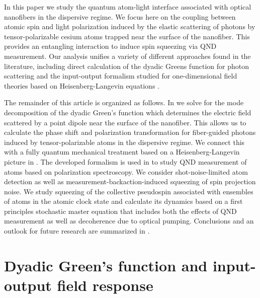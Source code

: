 \documentclass[aps,pra,twocolumn]{revtex4-1} %
\begin{document}
In this paper we study the quantum atom-light interface associated with optical nanofibers in the dispersive regime.  
We focus here on the coupling between atomic spin and light polarization induced by the elastic scattering of photons by tensor-polarizable cesium atoms trapped near the surface of the nanofiber.  
This provides an entangling interaction to induce spin squeezing via QND measurement.  
Our analysis unifies a variety of different approaches found in the literature, including direct calculation of the dyadic Greens function for photon scattering \cite{sakoda_optical_1996, dung_spontaneous_2000, sondergaard_general_2001, klimov_spontaneous_2004, wubs_multiple-scattering_2004, fussell_decay_2005, manga_rao_single_2007, dzsotjan_quantum_2010} and the input-output formalism studied for one-dimensional field theories based on Heisenberg-Langevin equations \cite{gardiner_input_1985, blow_continuum_1990, shen_coherent_2005, le_kien_spontaneous_2005, le_kien_correlations_2008, fan_input-output_2010}.

The remainder of this article is organized as follows.  
In  we solve for the mode decomposition of the dyadic Green's function which determines the electric field scattered by a point dipole near the surface of the nanofiber.  
This allows us to calculate the phase shift and polarization transformation for fiber-guided photons induced by tensor-polarizable atoms in the dispersive regime.  
We connect this with a fully quantum mechanical treatment based on a Heisenberg-Langevin picture in .  
The developed formalism is used in  to study QND measurement of atoms based on polarization spectroscopy. 
We consider shot-noise-limited atom detection as well as measurement-backaction-induced squeezing of spin projection noise.  
We study squeezing of the collective pseudospin associated with ensembles of atoms in the atomic clock state and calculate its dynamics based on a first principles stochastic master equation that includes both the effects of QND measurement as well as decoherence due to optical pumping.  
Conclusions and an outlook for future research are summarized in .  


\section{Dyadic Green's function and input-output field response} \label{Sec::GreensFunction}
\end{document}
